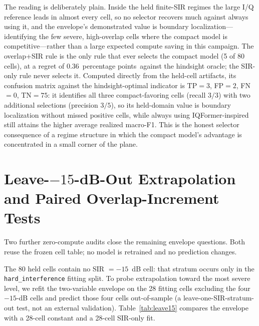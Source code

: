 \documentclass[letterpaper,onecolumn,11pt,journal]{IEEEtran}
\newcommand{\pp}{percentage points}
\begin{document}
The reading is deliberately plain. Inside the held finite-SIR regimes the
large I/Q reference leads in almost every cell, so no selector recovers much
against always using it, and the envelope's demonstrated value is boundary
localization---identifying the few severe, high-overlap cells where the
compact model is competitive---rather than a large expected compute saving in
this campaign. The overlap+SIR rule is the only rule that ever selects the
compact model (5 of 80 cells), at a regret of $0.36$~\pp\ against the
hindsight oracle; the SIR-only rule never selects it. Computed directly from
the held-cell artifacts, its confusion matrix against the hindsight-optimal
indicator is TP$=3$, FP$=2$, FN$=0$, TN$=75$: it identifies all three
compact-favoring cells (recall $3/3$) with two additional selections
(precision $3/5$), so its held-domain value is boundary localization without
missed positive cells, while always using IQFormer-inspired still attains the
higher average realized macro-F1. This is the honest
selector consequence of a regime structure in which the compact model's
advantage is concentrated in a small corner of the plane.

\section{Leave-\texorpdfstring{$-15$}{-15}-dB-Out Extrapolation and Paired Overlap-Increment Tests}
\label{sec:s4tests}
Two further zero-compute audits close the remaining envelope questions. Both
reuse the frozen cell table; no model is retrained and no prediction changes.

The 80 held cells contain no SIR $=-15$~dB cell: that stratum occurs only in
the \texttt{hard\_interference} fitting split. To probe extrapolation toward
the most severe level, we refit the two-variable envelope on the 28 fitting
cells excluding the four $-15$-dB cells and predict those four cells
out-of-sample (a leave-one-SIR-stratum-out test, not an external validation).
Table~\ref{tab:leave15} compares the envelope with a 28-cell constant and a
28-cell SIR-only fit.
\end{document}
